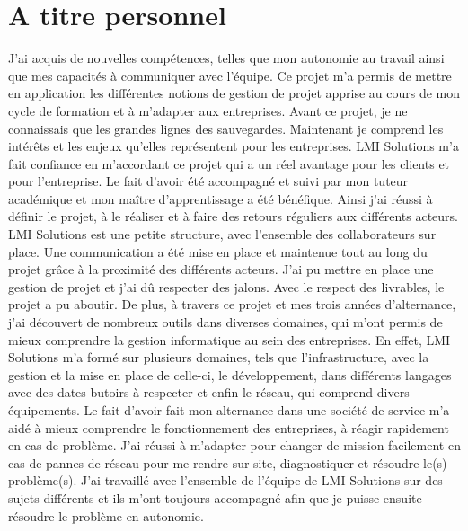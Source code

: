 \documentclass[pfe]{tnreport} %
\begin{document}
\section{A titre personnel}

J’ai acquis de nouvelles compétences, telles que mon autonomie au travail ainsi que mes capacités à communiquer avec l'équipe.\newline
Ce projet m'a permis de mettre en application les différentes notions de gestion de projet apprise au cours de mon cycle de formation et à m'adapter aux entreprises. Avant ce projet, je ne connaissais que les grandes lignes des sauvegardes. Maintenant je comprend les intérêts et les enjeux qu'elles représentent pour les entreprises. 
LMI Solutions m'a fait confiance en m'accordant ce projet qui a un réel avantage pour les clients et pour l'entreprise. Le fait d'avoir été accompagné et suivi par mon tuteur académique et mon maître d'apprentissage a été bénéfique. Ainsi j'ai réussi à définir le projet, à le réaliser et à faire des retours réguliers aux différents acteurs. \newline
LMI Solutions est une petite structure, avec l'ensemble des collaborateurs sur place. Une communication a été mise en place et maintenue tout au long du projet grâce à la proximité des différents acteurs. \newline
J'ai pu mettre en place une gestion de projet et j'ai dû respecter des jalons. Avec le respect des livrables, le projet a pu aboutir. \newline
De plus, à travers ce projet et mes trois années d'alternance, j'ai découvert de nombreux outils dans diverses domaines, qui m'ont permis de mieux comprendre la gestion informatique au sein des entreprises. \newline
En effet, LMI Solutions m'a formé sur plusieurs domaines, tels que l'infrastructure, avec la gestion et la mise en place de celle-ci, le développement, dans différents langages avec des dates butoirs à respecter et enfin le réseau, qui comprend divers équipements. \newline
Le fait d'avoir fait mon alternance dans une société de service m'a aidé à mieux comprendre le fonctionnement des entreprises, à réagir rapidement en cas de problème. J'ai réussi à m'adapter pour changer de mission facilement en cas de pannes de réseau pour me rendre sur site, diagnostiquer et résoudre le(s) problème(s).
J'ai travaillé avec l'ensemble de l'équipe de LMI Solutions sur des sujets différents et ils m'ont toujours accompagné afin que je puisse ensuite résoudre le problème en autonomie.
\end{document}
